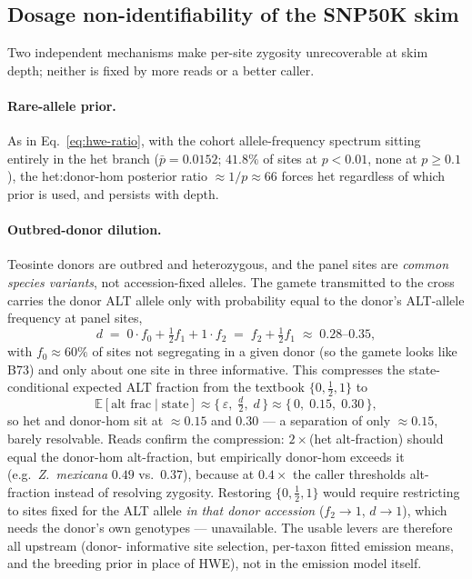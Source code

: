 \documentclass[11pt]{article}
\begin{document}
\subsection{Dosage non-identifiability of the SNP50K skim}
\label{sec:identifiability}

Two independent mechanisms make per-site zygosity unrecoverable at skim depth;
neither is fixed by more reads or a better caller.

\paragraph{Rare-allele prior.} As in Eq.~\eqref{eq:hwe-ratio}, with the cohort
allele-frequency spectrum sitting entirely in the het branch
($\bar p=0.0152$; $41.8\%$ of sites at $p<0.01$, none at $p\ge0.1$), the het:donor-hom
posterior ratio $\approx 1/p\approx 66$ forces het regardless of which prior is
used, and persists with depth.

\paragraph{Outbred-donor dilution.} Teosinte donors are outbred and heterozygous,
and the panel sites are \emph{common species variants}, not accession-fixed alleles.
The gamete transmitted to the cross carries the donor ALT allele only with
probability equal to the donor's ALT-allele frequency at panel sites,
\begin{equation}
d \;=\; 0\cdot f_0 + \tfrac12 f_1 + 1\cdot f_2 \;=\; f_2 + \tfrac12 f_1
\;\approx\; 0.28\text{--}0.35,
\label{eq:donor-dose}
\end{equation}
with $f_0\approx60\%$ of sites not segregating in a given donor (so the gamete looks
like B73) and only about one site in three informative. This compresses the
state-conditional expected ALT fraction from the textbook $\{0,\tfrac12,1\}$ to
\begin{equation}
\mathbb{E}[\text{alt frac}\mid\text{state}] \approx
\{\,\varepsilon,\; \tfrac{d}{2},\; d\,\}
\approx\{\,0,\; 0.15,\; 0.30\,\},
\label{eq:compressed-means}
\end{equation}
so het and donor-hom sit at $\approx 0.15$ and $0.30$ --- a separation of only
$\approx 0.15$, barely resolvable. Reads confirm the compression: $2\times$(het
alt-fraction) should equal the donor-hom alt-fraction, but empirically donor-hom
exceeds it (e.g.\ \emph{Z.\ mexicana} $0.49$ vs.\ $0.37$), because at $0.4\times$ the
caller thresholds alt-fraction instead of resolving zygosity. Restoring
$\{0,\tfrac12,1\}$ would require restricting to sites fixed for the ALT allele
\emph{in that donor accession} ($f_2\to1$, $d\to1$), which needs the donor's own
genotypes --- unavailable. The usable levers are therefore all upstream (donor-
informative site selection, per-taxon fitted emission means, and the breeding
prior in place of HWE), not in the emission model itself.
\end{document}
